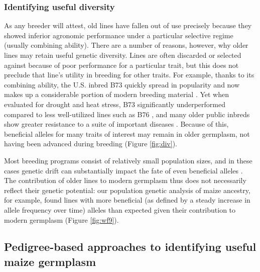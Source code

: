 \documentclass[12pt]{article}
\begin{document}
\subsubsection*{Identifying useful diversity}
As any breeder will attest, old lines have fallen out of use precisely because they showed inferior agronomic performance under a particular selective regime (usually combining ability).
There are a number of reasons, however, why older lines may retain useful genetic diversity.
Lines are often discarded or selected against because of poor performance for a particular trait, but this does not preclude that line's utility in breeding for other traits.
For example, thanks to its combining ability, the U.S. inbred B73 quickly spread in popularity and now makes up a considerable portion of modern breeding material \citep{van2012historical}. 
Yet when evaluated for drought and heat stress, B73 significantly underperformed compared to less well-utilized lines such as B76 \citep{chen2012characterization}, and many older public inbreds show greater resistance to a suite of important diseases \citep{wisser2011multivariate}. 
Because of this, beneficial alleles for many traits of interest may remain in older germplasm, not having been advanced during breeding (Figure \ref{fig:div}).

Most breeding programs consist of relatively small population sizes, and in these cases genetic drift can substantially impact the fate of even beneficial alleles \citep[e.g.][]{Gerke:2013tw}.
The contribution of older lines to modern germplasm thus does not necessarily reflect their genetic potential: our population genetic analysis of maize ancestry, for example, found lines with more beneficial (as defined by a steady increase in allele frequency over time) alleles than expected given their contribution to modern germplasm (Figure \ref{fig:wf9}).

 

\subsection*{Pedigree-based approaches to identifying useful maize germplasm}
\end{document}
